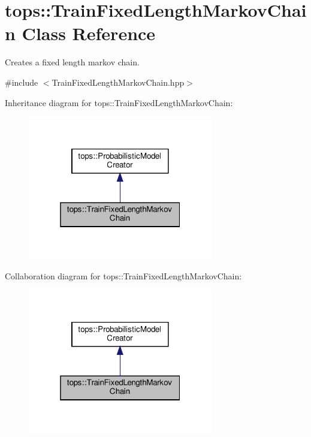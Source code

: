 \hypertarget{classtops_1_1TrainFixedLengthMarkovChain}{}\section{tops\+:\+:Train\+Fixed\+Length\+Markov\+Chain Class Reference}
\label{classtops_1_1TrainFixedLengthMarkovChain}


Creates a fixed length markov chain.  




{\ttfamily \#include $<$Train\+Fixed\+Length\+Markov\+Chain.\+hpp$>$}



Inheritance diagram for tops\+:\+:Train\+Fixed\+Length\+Markov\+Chain\+:
\nopagebreak
\begin{figure}[H]
\begin{center}
\leavevmode
\includegraphics[width=229pt]{classtops_1_1TrainFixedLengthMarkovChain__inherit__graph}
\end{center}
\end{figure}


Collaboration diagram for tops\+:\+:Train\+Fixed\+Length\+Markov\+Chain\+:
\nopagebreak
\begin{figure}[H]
\begin{center}
\leavevmode
\includegraphics[width=229pt]{classtops_1_1TrainFixedLengthMarkovChain__coll__graph}
\end{center}
\end{figure}
